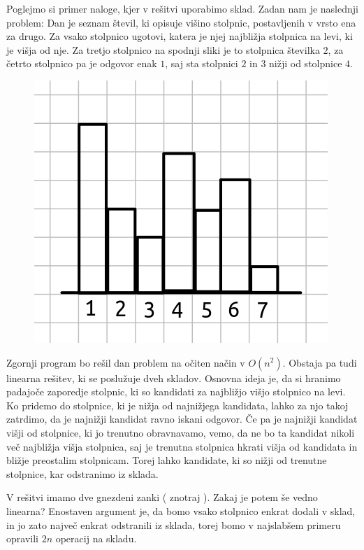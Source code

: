 Poglejmo si primer naloge, kjer v rešitvi uporabimo sklad.
Zadan nam je naslednji problem:
Dan je seznam števil, ki opisuje višino stolpnic, postavljenih v vrsto ena za
drugo.
Za vsako stolpnico ugotovi, katera je njej najbližja stolpnica na levi, ki je
višja od nje.
Za tretjo stolpnico na spodnji sliki je to stolpnica številka $2$, za četrto
stolpnico pa je odgovor enak $1$, saj sta stolpnici $2$ in $3$ nižji od
stolpnice $4$.

\begin{figure}[h!]
  \centering
  \includegraphics[width=0.5\linewidth]{poglavja/podatkovne-strukture/stolpnice}
\end{figure}


Zgornji program bo rešil dan problem na očiten način v $O(n^2)$.
Obstaja pa tudi linearna rešitev, ki se poslužuje dveh skladov.
Osnovna ideja je, da si hranimo padajoče zaporedje stolpnic, ki so kandidati za
najbližjo višjo stolpnico na levi.
Ko pridemo do stolpnice, ki je nižja od najnižjega kandidata, lahko za njo takoj
zatrdimo, da je najnižji kandidat ravno iskani odgovor.
Če pa je najnižji kandidat višji od stolpnice, ki jo trenutno obravnavamo, vemo,
da ne bo ta kandidat nikoli več najbližja višja stolpnica, saj je trenutna
stolpnica hkrati višja od kandidata in bližje preostalim stolpnicam.
Torej lahko kandidate, ki so nižji od trenutne stolpnice, kar odstranimo iz
sklada.

V rešitvi imamo dve gnezdeni zanki ( znotraj ).
Zakaj je potem še vedno linearna?
Enostaven argument je, da bomo vsako stolpnico enkrat dodali v sklad, in jo
zato največ enkrat odstranili iz sklada, torej bomo v najslabšem primeru
opravili $2n$ operacij na skladu.



